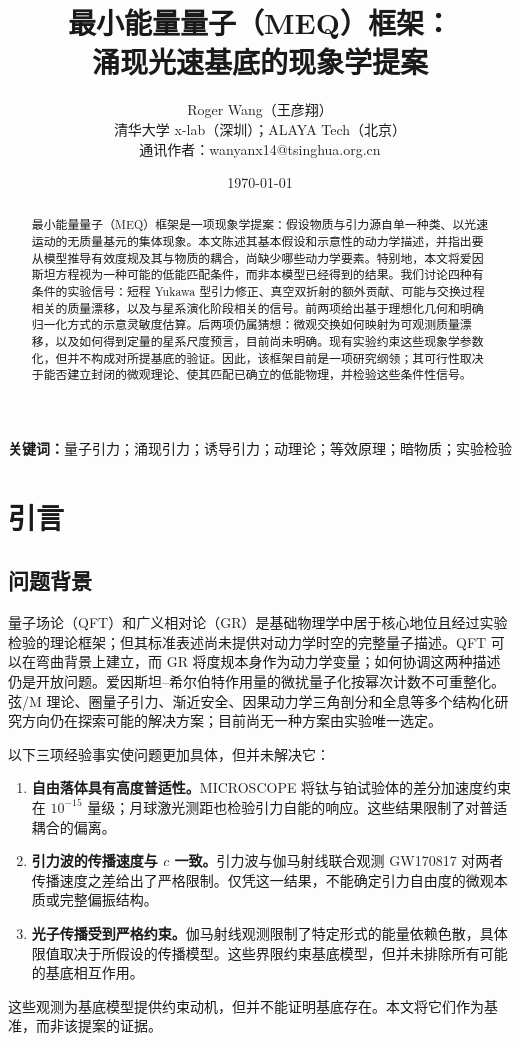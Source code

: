 \documentclass[UTF8,fontset=none,11pt,a4paper]{ctexart}
\title{最小能量量子（MEQ）框架：\\涌现光速基底的现象学提案}
\author{Roger Wang（王彦翔）\\[2pt]
\small 清华大学 x-lab（深圳）；ALAYA Tech（北京）\\
\small 通讯作者：wanyanx14@tsinghua.org.cn}
\date{\today}
\begin{document}
\maketitle

\begin{abstract}
最小能量量子（MEQ）框架是一项现象学提案：假设物质与引力源自单一种类、以光速运动的无质量基元的集体现象。本文陈述其基本假设和示意性的动力学描述，并指出要从模型推导有效度规及其与物质的耦合，尚缺少哪些动力学要素。特别地，本文将爱因斯坦方程视为一种可能的低能匹配条件，而非本模型已经得到的结果。我们讨论四种有条件的实验信号：短程 Yukawa 型引力修正、真空双折射的额外贡献、可能与交换过程相关的质量漂移，以及与星系演化阶段相关的信号。前两项给出基于理想化几何和明确归一化方式的示意灵敏度估算。后两项仍属猜想：微观交换如何映射为可观测质量漂移，以及如何得到定量的星系尺度预言，目前尚未明确。现有实验约束这些现象学参数化，但并不构成对所提基底的验证。因此，该框架目前是一项研究纲领；其可行性取决于能否建立封闭的微观理论、使其匹配已确立的低能物理，并检验这些条件性信号。
\end{abstract}

\noindent\textbf{关键词：}量子引力；涌现引力；诱导引力；动理论；等效原理；暗物质；实验检验

\tableofcontents

\section{引言}\label{sec:intro}

\subsection{问题背景}

量子场论（QFT）和广义相对论（GR）是基础物理学中居于核心地位且经过实验检验的理论框架；但其标准表述尚未提供对动力学时空的完整量子描述。QFT 可以在弯曲背景上建立，而 GR 将度规本身作为动力学变量；如何协调这两种描述仍是开放问题。爱因斯坦--希尔伯特作用量的微扰量子化按幂次计数不可重整化。弦/M 理论、圈量子引力、渐近安全、因果动力学三角剖分和全息等多个结构化研究方向仍在探索可能的解决方案；目前尚无一种方案由实验唯一选定\cite{Rovelli2015,Polchinski1998,Reuter1998,Loll2020,Batista2025}。

以下三项经验事实使问题更加具体，但并未解决它：
\begin{enumerate}
\item \textbf{自由落体具有高度普适性。}MICROSCOPE 将钛与铂试验体的差分加速度约束在 $10^{-15}$ 量级\cite{Touboul2022}；月球激光测距也检验引力自能的响应\cite{Williams2004}。这些结果限制了对普适耦合的偏离。
\item \textbf{引力波的传播速度与 $c$ 一致。}引力波与伽马射线联合观测 GW170817 对两者传播速度之差给出了严格限制\cite{GW170817}。仅凭这一结果，不能确定引力自由度的微观本质或完整偏振结构。
\item \textbf{光子传播受到严格约束。}伽马射线观测限制了特定形式的能量依赖色散，具体限值取决于所假设的传播模型\cite{Abdo2009,Vasileiou2013}。这些界限约束基底模型，但并未排除所有可能的基底相互作用。
\end{enumerate}
这些观测为基底模型提供约束动机，但并不能证明基底存在。本文将它们作为基准，而非该提案的证据。
\end{document}

